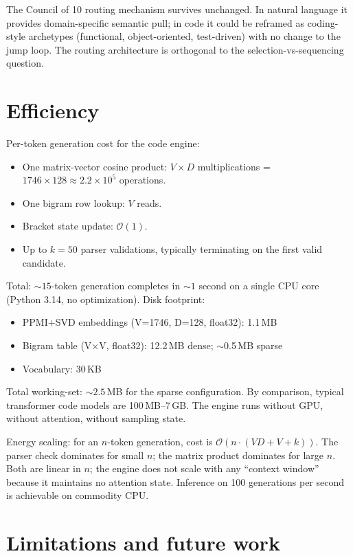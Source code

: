 \documentclass[11pt,a4paper]{article}
\begin{document}
The Council of 10 routing mechanism survives unchanged. In natural language it provides domain-specific semantic pull; in code it could be reframed as coding-style archetypes (functional, object-oriented, test-driven) with no change to the jump loop. The routing architecture is orthogonal to the selection-vs-sequencing question.

\section{Efficiency}\label{sec:efficiency}

Per-token generation cost for the code engine:
\begin{itemize}
\item One matrix-vector cosine product: $V \times D$ multiplications = $1746 \times 128 \approx 2.2 \times 10^5$ operations.
\item One bigram row lookup: $V$ reads.
\item Bracket state update: $\mathcal{O}(1)$.
\item Up to $k = 50$ parser validations, typically terminating on the first valid candidate.
\end{itemize}

Total: $\sim 15$-token generation completes in $\sim 1$ second on a single CPU core (Python 3.14, no optimization). Disk footprint:
\begin{itemize}
\item PPMI+SVD embeddings (V=1746, D=128, float32): 1.1\,MB
\item Bigram table (V$\times$V, float32): 12.2\,MB dense; $\sim$0.5\,MB sparse
\item Vocabulary: 30\,KB
\end{itemize}

Total working-set: $\sim 2.5$\,MB for the sparse configuration. By comparison, typical transformer code models are 100\,MB--7\,GB. The engine runs without GPU, without attention, without sampling state.

Energy scaling: for an $n$-token generation, cost is $\mathcal{O}(n \cdot (V D + V + k))$. The parser check dominates for small $n$; the matrix product dominates for large $n$. Both are linear in $n$; the engine does not scale with any ``context window'' because it maintains no attention state. Inference on 100 generations per second is achievable on commodity CPU.

\section{Limitations and future work}\label{sec:limitations}
\end{document}
